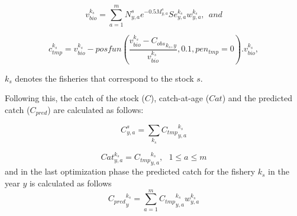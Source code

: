 \documentclass{article}
\begin{document}
\begin{equation}
v_{bio}^{k_s}=\sum_{a=1}^mN^s_{y,a}e^{-0.5M^s_{y,a}} Se_{y,a}^{k_s} w_{y,a}^{k_s}, \ \ and 
\end{equation}
    

\begin{equation}
c_{tmp}^{k_s} = v_{bio}^{k_s}-posfun\left(\frac{v_{bio}^{k_s} - {C_{obs}}_{k_s,y}}{v_{bio}^{k_s}} , 0.1 , pen_{tmp}=0 \right).v_{bio}^{k_s},
\end{equation}

 $k_s$ denotes the fisheries that correspond to the stock $s$.


Following this, the catch of the stock ($C$), catch-at-age ($Cat$) and the predicted catch ($C_{pred}$) are calculated as follows:

\begin{equation}
C^s_{y,a}=\sum_{k_s}{C_{tmp}}^{k_s}_{y,a} 
\end{equation}

\begin{equation}
Cat^{k_s}_{y,a}={C_{tmp}}^{k_s}_{y,a},  \  \  \ 1\leq a \leq m
\end{equation}
and in the last optimization phase the predicted catch for the fishery $k_s$ in the year $y$ is calculated as follows 
\begin{equation}
{C_{pred}}^{k_s}_y=\sum_{a=1}^{m}{C_{tmp}}^{k_s}_{y,a} w_{y,a}^{k_s}
\end{equation} 
\end{document}
